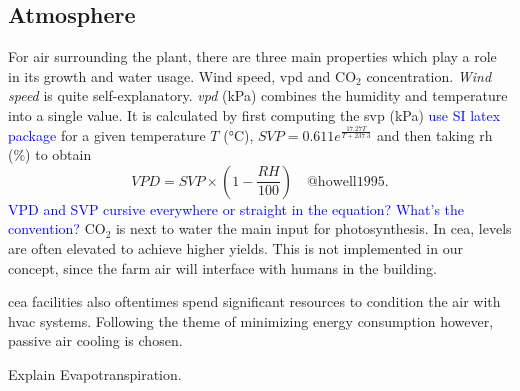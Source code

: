 \subsection{Atmosphere}
For air surrounding the plant, there are three main properties which play a role in its growth and water usage.
Wind speed, \ac{vpd} and $\text{CO}_2$ concentration.
\textit{Wind speed} is quite self-explanatory.
\textit{\ac{vpd}} (kPa) combines the humidity and temperature into a single value.
It is calculated by first computing the \ac{svp} (kPa) \textcolor{Blue}{use SI latex package} for a given temperature $T$ (°C), $SVP = 0.611 e^{\frac{17.27 T}{T + 237.3}}$ and then taking \ac{rh} (\%) to obtain
$$
VPD = SVP \times (1-\frac{RH}{100}) \quad \text{@howell1995}.
$$
\textcolor{Blue}{VPD and SVP cursive everywhere or straight in the equation? What's the convention?}
\textit{$\text{CO}_2$} is next to water the main input for photosynthesis.
In \ac{cea}, levels are often elevated to achieve higher yields.
This is not implemented in our concept, since the farm air will interface with humans in the building.

\ac{cea} facilities also oftentimes spend significant resources to condition the air with \ac{hvac} systems.
Following the theme of minimizing energy consumption however, passive air cooling is chosen.

Explain Evapotranspiration.


